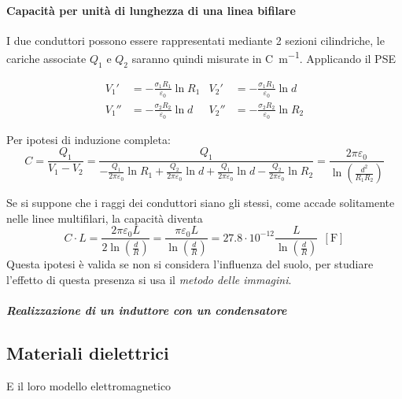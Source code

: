 
\paragraph{Capacità per unità di lunghezza di una linea bifilare}

I due conduttori possono essere rappresentati mediante 2 sezioni cilindriche,
le cariche associate $Q_1$ e $Q_2$ saranno quindi misurate in \si{\coulomb\per\meter}.
Applicando il PSE

\begin{align*}
V_1' &= -\frac{\sigma_1 R_1}{\varepsilon_0} \ln R_1 & V_2' &= -\frac{\sigma_1 R_1}{\varepsilon_0} \ln d\\
V_1'' &= -\frac{\sigma_2 R_2}{\varepsilon_0} \ln d & V_2'' &= -\frac{\sigma_2 R_2}{\varepsilon_0} \ln R_2
\end{align*}

Per ipotesi di induzione completa:
$$
C = \frac{Q_1}{V_1-V_2} = \frac{Q_1}{-\frac{Q_1}{2\pi\varepsilon_0}\ln R_1 + \frac{Q_2}{2\pi\varepsilon_0}\ln d + \frac{Q_1}{2\pi\varepsilon_0}\ln d - \frac{Q_2}{2 \pi \varepsilon_0} \ln R_2} = \frac{2\pi\varepsilon_0}{\ln \left(\frac{d^2}{R_1R_2}\right)}
$$

Se si suppone che i raggi dei conduttori siano gli stessi, come accade solitamente nelle linee multifilari, la capacità diventa
$$
C\cdot L = \frac{2\pi\varepsilon_0 L}{2 \ln \left(\frac{d}{R}\right)} = \frac{\pi \varepsilon_0 L}{\ln \left(\frac{d}{R}\right)} = 27.8\cdot 10^{-12} \frac{L}{\ln\left(\frac{d}{R}\right)}\ \ [\si{\farad}]
$$
Questa ipotesi è valida se non si considera l'influenza del suolo, per studiare l'effetto di questa 
presenza si usa il \textit{metodo delle immagini}.

\subparagraph{Realizzazione di un induttore con un condensatore}



\subsection{Materiali dielettrici}
E il loro modello elettromagnetico
